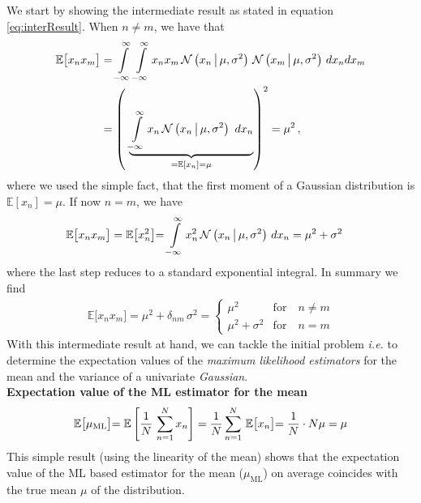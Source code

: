 \documentclass[11pt,DINA4, fleqn]{amsart}
\begin{document}
We start by showing the intermediate result as stated in equation \eqref{eq:interResult}. When $n\neq m$, we have that
\begin{align}
\mathbb{E}\bigl[x_n x_m\bigl] &=
\int \displaylimits_{-\infty}^{\infty}\int \displaylimits_{-\infty}^{\infty}
x_n x_m \, 
\mathcal{N}\left(x_n \,\bigl| \, \mu, \sigma^2\right) \,
\mathcal{N}\left(x_m \,\bigl| \, \mu, \sigma^2\right) \, dx_n dx_m \\
&= 
\left( \, \,
\underbrace{
\int \displaylimits_{-\infty}^{\infty}
x_n \,
\mathcal{N}\left(x_n \,\bigl| \, \mu, \sigma^2\right) \, \, dx_n
}_{=\mathbb{E}[x_n] = \mu}\right)^2
= \mu^2 \, ,
\end{align}
where we used the simple fact, that the first moment of a Gaussian distribution is $\mathbb{E}[x_n] = \mu$.
If now $n=m$, we have
\begin{align}
\mathbb{E}\bigl[x_n x_m\bigl] &= \mathbb{E}\bigl[x_n^2\bigl] = \int \displaylimits_{-\infty}^{\infty}
x_n^2 \, 
\mathcal{N}\left(x_n \,\bigl| \, \mu, \sigma^2\right) \, dx_n =
\mu^2 + \sigma^2 \,
\label{eq:2ndmoment}
\end{align}
where the last step reduces to a standard exponential integral.
In summary we find
\begin{align}
\mathbb{E}\bigl[x_n x_m\bigl] 
 = \mu^2 + \delta_{nm} \, \sigma^2
 =\begin{cases}
 \mu^2 & \text{for} \quad n\neq m \\
 \mu^2 + \sigma^2 & \text{for} \quad n = m
 \end{cases}
\end{align}
With this intermediate result at hand, we can tackle the initial problem \textit{i.e.} to determine the expectation values of the \emph{maximum likelihood estimators} for the mean and the variance of a univariate \emph{Gaussian}. \\

\noindent
\textbf{Expectation value of the ML estimator for the mean}\\
\begin{align}
\mathbb{E}\bigl[\mu_{\text{ML}}\bigl] = 
\mathbb{E}\left[\dfrac{1}{N} \, \sum\displaylimits_{n=1}^{N} x_n\right] = \dfrac{1}{N} \sum \displaylimits_{n=1}^{N} \, \mathbb{E}\bigl[x_n\bigl] = \dfrac{1}{N} \cdot N \mu = \mu
\end{align}
This simple result (using the linearity of the mean) shows that the expectation value of the ML based estimator for the mean ($\mu_{\text{ML}}$) on average coincides with the true mean $\mu$ of the distribution.\\
\end{document}
